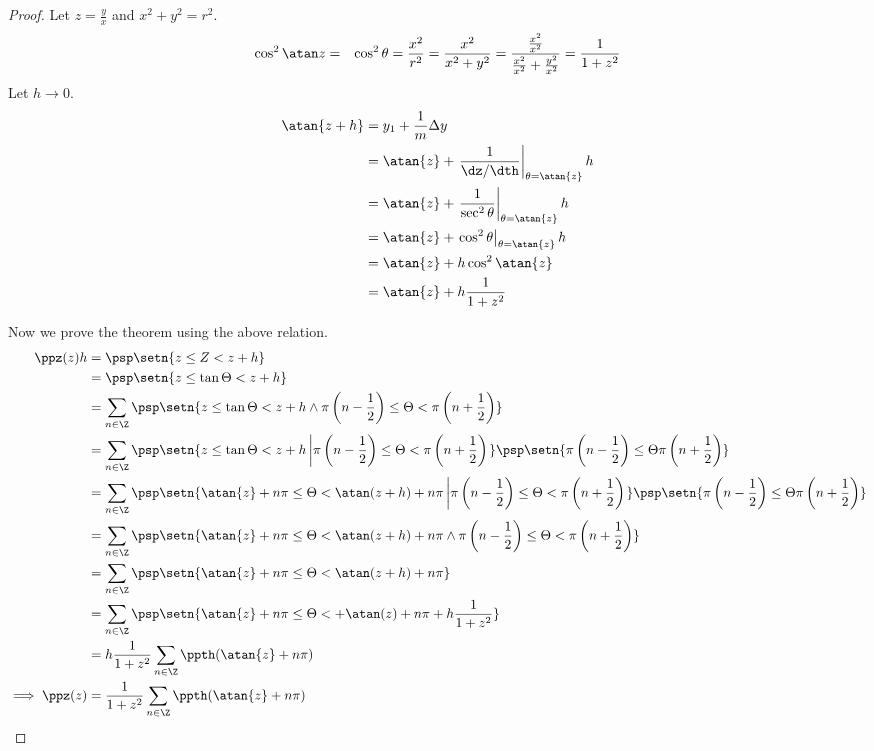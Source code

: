 \begin{proof}
Let $z=\frac{y}{x}$ and $x^2 + y^2 = r^2$.
\begin{align*}
  \cos^2\atan z
    &=& \cos^2\theta
     =  \frac{x^2}{r^2}
     =  \frac{x^2}{x^2+y^2}
     =  \frac{\frac{x^2}{x^2}}{\frac{x^2}{x^2}+\frac{y^2}{x^2}}
     =  \frac{1}{1+z^2}
\end{align*}
Let $h\to0$.
\begin{align*}
  \atan{z+h}
    &=    y_1 + \frac{1}{m} \Delta y
  \\&=    \atan{z} + \left.\frac{1}{\dz/\dth}\right|_{\theta=\atan{z}} h
  \\&=    \atan{z} + \left.\frac{1}{\sec^2\theta}\right|_{\theta=\atan{z}} h
  \\&=    \atan{z} + \left.\cos^2\theta\right|_{\theta=\atan{z}} h
  \\&=    \atan{z} + h\cos^2\atan{z}
  \\&=    \atan{z} + h\frac{1}{1+z^2}
\end{align*}

Now we prove the theorem using the above relation.
\begin{align*}
  \ppz(z)h
    &=    \psp\setn{z\le Z < z+h}
  \\&=    \psp\setn{z\le \tan\Theta < z+h}
  \\&=    \sum_{n\in\Z}\psp\setn{z\le \tan\Theta < z+h \land
                 \pi\left(n-\frac{1}{2}\right) \le \Theta < \pi\left(n+\frac{1}{2}\right)
                 }
  \\&=    \sum_{n\in\Z}\psp\setn{z\le \tan\Theta < z+h \left|
                 \pi\left(n-\frac{1}{2}\right) \le \Theta < \pi\left(n+\frac{1}{2}\right)
                 \right.}
                 \psp\setn{\pi\left(n-\frac{1}{2}\right) \le \Theta \pi\left(n+\frac{1}{2}\right)}
  \\&=    \sum_{n\in\Z}\psp\setn{\atan{z}+n\pi \le \Theta < \atan(z+h)+n\pi \left|
                 \pi\left(n-\frac{1}{2}\right) \le \Theta < \pi\left(n+\frac{1}{2}\right)
                 \right.}
                 \psp\setn{\pi\left(n-\frac{1}{2}\right) \le \Theta \pi\left(n+\frac{1}{2}\right)}
  \\&=    \sum_{n\in\Z}\psp\setn{\atan{z}+n\pi \le \Theta < \atan(z+h)+n\pi \land
                 \pi\left(n-\frac{1}{2}\right) \le \Theta < \pi\left(n+\frac{1}{2}\right)
                 }
  \\&=    \sum_{n\in\Z}\psp\setn{\atan{z}+n\pi \le \Theta < \atan(z+h)+n\pi }
  \\&=    \sum_{n\in\Z}\psp\setn{\atan{z}+n\pi \le \Theta < +\atan(z)+n\pi + h\frac{1}{1+z^2} }
  \\&=    h\frac{1}{1+z^2} \sum_{n\in\Z}\ppth(\atan{z}+n\pi)
\\\implies
  \ppz(z) &=  \frac{1}{1+z^2} \sum_{n\in\Z}\ppth(\atan{z}+n\pi)
\end{align*}


\end{proof}
